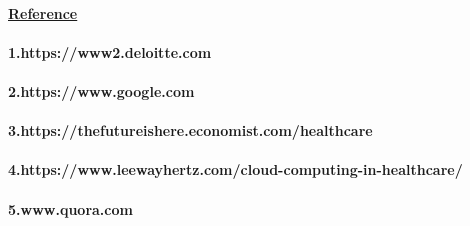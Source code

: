 \documentclass[12pt]{article}
\begin{document}
       \paragraph{\textbf{\underline{\Huge Reference}}
   	    \centering
   	    \\\large \\1.https://www2.deloitte.com
   	    \\\\2.https://www.google.com
   	    \\\\3.https://thefutureishere.economist.com/healthcare
   	    \\\\4.https://www.leewayhertz.com/cloud-computing-in-healthcare/
   	    \\\\5.www.quora.com}
  
\end{document}
